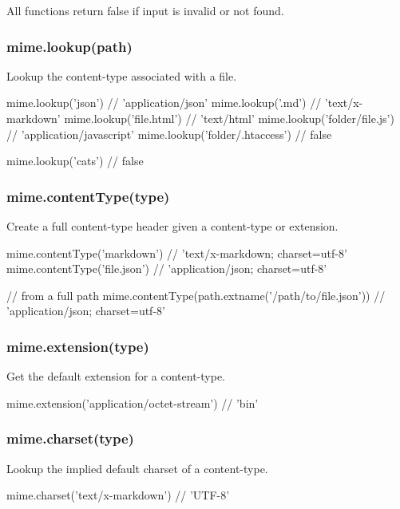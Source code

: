All functions return {\ttfamily false} if input is invalid or not found.

\subsubsection*{mime.\+lookup(path)}

Lookup the content-\/type associated with a file.


\begin{DoxyCode}
mime.lookup('json')             // 'application/json'
mime.lookup('.md')              // 'text/x-markdown'
mime.lookup('file.html')        // 'text/html'
mime.lookup('folder/file.js')   // 'application/javascript'
mime.lookup('folder/.htaccess') // false

mime.lookup('cats') // false
\end{DoxyCode}


\subsubsection*{mime.\+content\+Type(type)}

Create a full content-\/type header given a content-\/type or extension.


\begin{DoxyCode}
mime.contentType('markdown')  // 'text/x-markdown; charset=utf-8'
mime.contentType('file.json') // 'application/json; charset=utf-8'

// from a full path
mime.contentType(path.extname('/path/to/file.json')) // 'application/json; charset=utf-8'
\end{DoxyCode}


\subsubsection*{mime.\+extension(type)}

Get the default extension for a content-\/type.


\begin{DoxyCode}
mime.extension('application/octet-stream') // 'bin'
\end{DoxyCode}


\subsubsection*{mime.\+charset(type)}

Lookup the implied default charset of a content-\/type.


\begin{DoxyCode}
mime.charset('text/x-markdown') // 'UTF-8'
\end{DoxyCode}



